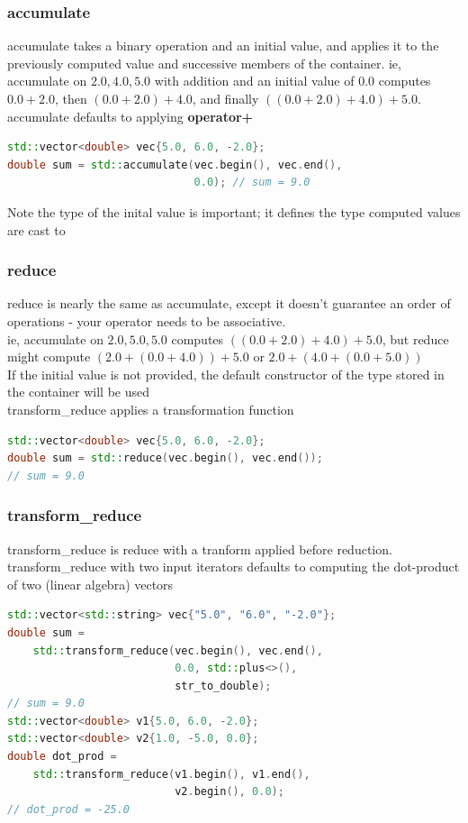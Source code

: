 \documentclass{beamer}
\begin{document}
\begin{frame}[fragile]
  \frametitle{accumulate}
  accumulate takes a binary operation and an initial value,
  and applies it to the previously computed value and successive members of the container.
  ie, accumulate on ${2.0, 4.0, 5.0}$ with addition and an initial value of $0.0$ computes
  $0.0 + 2.0$, then $(0.0 + 2.0) + 4.0$, and finally $((0.0 + 2.0) + 4.0) + 5.0$.\\
  accumulate defaults to applying {\bf operator+}\\
  \begin{lstlisting}[language=C++]
std::vector<double> vec{5.0, 6.0, -2.0};
double sum = std::accumulate(vec.begin(), vec.end(),
                             0.0); // sum = 9.0
  \end{lstlisting}
Note the type of the inital value is important; it defines the type computed values are cast to
\end{frame}

\begin{frame}[fragile]
  \frametitle{reduce}
  reduce is nearly the same as accumulate, except it doesn't guarantee an order of operations
  - your operator needs to be associative.\\
  ie, accumulate on ${2.0, 5.0, 5.0}$ computes $((0.0 + 2.0) + 4.0) + 5.0$,
  but reduce might compute $(2.0 + (0.0 + 4.0)) + 5.0$ or $2.0 + (4.0 + (0.0 + 5.0))$\\
  If the initial value is not provided, the default constructor of the type stored in the container will be used\\
  transform\_reduce applies a transformation function
  \begin{lstlisting}[language=C++]
std::vector<double> vec{5.0, 6.0, -2.0};
double sum = std::reduce(vec.begin(), vec.end());
// sum = 9.0
  \end{lstlisting}
\end{frame}

\begin{frame}[fragile]
  \frametitle{transform\_reduce}
    transform\_reduce is reduce with a tranform applied before reduction.\\
    transform\_reduce with two input iterators defaults to computing the dot-product of two (linear algebra) vectors
  \begin{lstlisting}[language=C++]
std::vector<std::string> vec{"5.0", "6.0", "-2.0"};
double sum =
    std::transform_reduce(vec.begin(), vec.end(),
                          0.0, std::plus<>(),
                          str_to_double);
// sum = 9.0
std::vector<double> v1{5.0, 6.0, -2.0};
std::vector<double> v2{1.0, -5.0, 0.0};
double dot_prod =
    std::transform_reduce(v1.begin(), v1.end(),
                          v2.begin(), 0.0);
// dot_prod = -25.0
  \end{lstlisting}
\end{frame}
\end{document}
